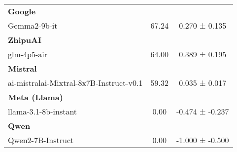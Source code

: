 \begin{table}[htbp]
\begin{tabular}{lcc}
\midrule
\multicolumn{3}{l}{\textbf{Google}}\\
Gemma2-9b-it & 67.24 & 0.270 ± 0.135 \\
\midrule
\multicolumn{3}{l}{\textbf{ZhipuAI}}\\
glm-4p5-air & 64.00 & 0.389 ± 0.195 \\
\midrule
\multicolumn{3}{l}{\textbf{Mistral}}\\
ai-mistralai-Mixtral-8x7B-Instruct-v0.1 & 59.32 & 0.035 ± 0.017 \\
\midrule
\multicolumn{3}{l}{\textbf{Meta (Llama)}}\\
llama-3.1-8b-instant & 0.00 & -0.474 ± -0.237 \\
\midrule
\multicolumn{3}{l}{\textbf{Qwen}}\\
Qwen2-7B-Instruct & 0.00 & -1.000 ± -0.500 \\
\bottomrule
\end{tabular}
\end{table}
